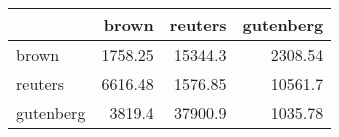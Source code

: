 \begin{tabular}{lrrr}
\hline
           &   brown &   reuters &   gutenberg \\
\hline
 brown     & 1758.25 &  15344.3  &     2308.54 \\
 reuters   & 6616.48 &   1576.85 &    10561.7  \\
 gutenberg & 3819.4  &  37900.9  &     1035.78 \\
\hline
\end{tabular}